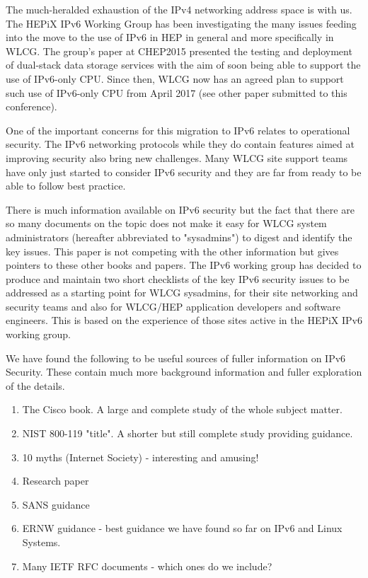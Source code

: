 The much-heralded exhaustion of the IPv4 networking address space is with us. The HEPiX
IPv6 Working Group \cite{ipv6wg} has been investigating the many issues feeding into the move to the use of IPv6 in HEP in general and more specifically in WLCG. The group's paper at CHEP2015 \cite{ipv6chep2015} presented the testing and deployment of dual-stack data storage services with the aim of soon being able to support the use of IPv6-only CPU. Since then, WLCG now has an agreed plan to support such use of IPv6-only CPU from April 2017 (see other paper submitted to this conference).

One of the important concerns for this migration to IPv6 relates to operational security. The IPv6 networking protocols while they do contain features aimed at improving security also bring new challenges. Many WLCG site support teams have only just started to consider IPv6 security and they are far from ready to be able to follow best practice. 

There is much information available on IPv6 security but the fact that there are so many documents on the topic does not make it easy for WLCG system administrators (hereafter abbreviated to "sysadmins") to digest and identify the key issues. This paper is not competing with the other information but gives pointers to these other books and papers. The IPv6 working group has decided to produce and maintain two short checklists of the key IPv6 security issues to be addressed as a starting point for WLCG sysadmins, for their site networking and security teams and also for WLCG/HEP application developers and software engineers. This is based on the experience of those sites active in the HEPiX IPv6 working group. 

We have found the following to be useful sources of fuller information on IPv6 Security. These contain much more background information and fuller exploration of the details.

\begin {enumerate}
\item The Cisco book. A large and complete study of the whole subject matter.
\item NIST 800-119 "title". A shorter but still complete study providing guidance.
\item 10 myths (Internet Society) - interesting and amusing!
\item Research paper
\item SANS guidance
\item ERNW guidance - best guidance we have found so far on IPv6 and Linux Systems.
\item Many IETF RFC documents - which ones do we include?
\end {enumerate}

